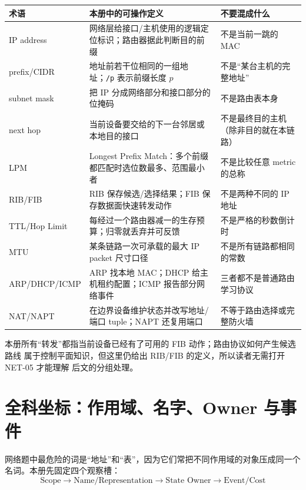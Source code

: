 \documentclass[11pt,a4paper]{ctexart}
\newcommand{\code}[1]{\texttt{#1}}
\begin{document}
\begin{center}
\small
\begin{tabularx}{\linewidth}{L{2.5cm}L{4.1cm}Y}
\toprule
术语 & 本册中的可操作定义 & 不要混成什么 \\
\midrule
IP address & 网络层给接口/主机使用的逻辑定位标识；路由器据此判断目的前缀 & 不是当前一跳的 MAC \\
prefix/CIDR & 地址前若干位相同的一组地址；\code{/p} 表示前缀长度 $p$ & 不是“某台主机的完整地址” \\
subnet mask & 把 IP 分成网络部分和接口部分的位掩码 & 不是路由表本身 \\
next hop & 当前设备要交给的下一台邻居或本地目的接口 & 不是最终目的主机（除非目的就在本链路） \\
LPM & Longest Prefix Match：多个前缀都匹配时选位数最多、范围最小者 & 不是比较任意 metric 的总称 \\
RIB/FIB & RIB 保存候选/选择结果；FIB 保存数据面快速转发动作 & 不是两种不同的 IP 地址 \\
TTL/Hop Limit & 每经过一个路由器减一的生存预算；归零就丢弃并可反馈 & 不是严格的秒数倒计时 \\
MTU & 某条链路一次可承载的最大 IP packet 尺寸口径 & 不是所有链路都相同的常数 \\
ARP/DHCP/ICMP & ARP 找本地 MAC；DHCP 给主机租约配置；ICMP 报告部分网络事件 & 三者都不是普通路由学习协议 \\
NAT/NAPT & 在边界设备维护状态并改写地址/端口 tuple；NAPT 还复用端口 & 不等于路由选择或完整防火墙 \\
\bottomrule
\end{tabularx}
\end{center}

本册所有“转发”都指当前设备已经有了可用的 FIB 动作；路由协议如何产生候选路线
属于控制平面知识，但这里仍给出 RIB/FIB 的定义，所以读者无需打开 NET-05 才能理解
后文的分组处理。

\tableofcontents
\newpage

\section{全科坐标：作用域、名字、Owner 与事件}

网络题中最危险的词是“地址”和“表”，因为它们常把不同作用域的对象压成同一个名词。本册先固定四个观察槽：
\[
\boxed{\text{Scope}\to\text{Name/Representation}\to\text{State Owner}\to\text{Event/Cost}}
\]
\end{document}
